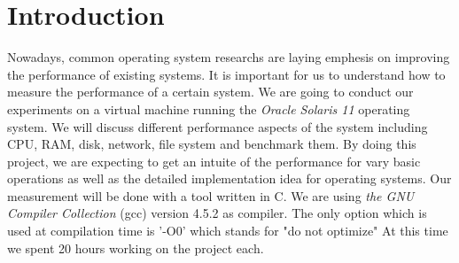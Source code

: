 \section{Introduction}

Nowadays, common operating system researchs are laying emphesis on improving the performance of existing systems.
It is important for us to understand how to measure the performance of a certain system.
We are going to conduct our experiments on a virtual machine running the \emph{Oracle Solaris
11} operating system.
We will discuss different performance aspects of the system including CPU, RAM, disk,
network, file system and benchmark them.
By doing this project, we are expecting to get an intuite of the performance for
vary basic operations as well as the detailed implementation idea for operating systems.
Our measurement will be done with a tool written in C.
We are using \emph{the GNU Compiler Collection} (gcc) version 4.5.2 as
compiler.
The only option which is used at compilation time is '-O0' which stands for "do
not optimize"
At this time we spent 20 hours working on the project each.
